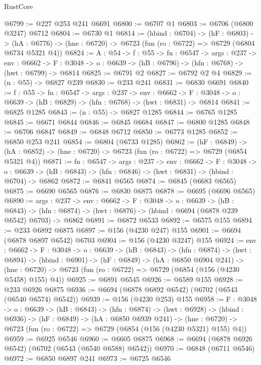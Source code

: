 \begin{lexlean}{RustCore}
\begin{coremodule}
@6799 := @227 @253 @241 @6691
@6800 := @6707 @1
@6803 := @6706 (@6800 @3247) @6712
@6804 := @6730 @1
@6814 := (hbind : @6704) ->
  (hF : @6803) ->
  (hA : @6776) -> (hne : @6720) -> @6723 (fun (ro : @6722) => @6729 (@6804 @6734 @5321 @4))
@6824 := {A : @54} ->
  {f : @55} ->
  {fn : @6547} ->
  {args : @237} ->
  {env : @6662} ->
  {F : @3048} -> {o : @6639} -> (hB : @6796) -> (hfn : @6768) -> (hwt : @6799) -> @6814
@6825 := @6791 @2
@6827 := @6792 @2 @4
@6829 := (n : @55) -> @6827 @239
@6830 := @233 @241
@6831 := @6830 @6691
@6840 := {f : @55} ->
  {fn : @6547} ->
  {args : @237} ->
  {env : @6662} ->
  {F : @3048} -> {o : @6639} -> (hB : @6829) -> (hfn : @6768) -> (hwt : @6831) -> @6814
@6841 := @6825 @1285
@6843 := (n : @55) -> @6827 @1285
@6844 := @6765 @1285
@6845 := @6671 @6844
@6846 := @6845 @6684
@6847 := @6800 @1285
@6848 := @6706 @6847
@6849 := @6848 @6712
@6850 := @6773 @1285
@6852 := @6850 @253 @241
@6854 := @6804 (@6733 @1285)
@6862 := (hF : @6849) ->
  (hA : @6852) -> (hne : @6720) -> @6723 (fun (ro : @6722) => @6729 (@6854 @5321 @4))
@6871 := {fn : @6547} ->
  {args : @237} ->
  {env : @6662} ->
  {F : @3048} ->
  {o : @6639} -> (hB : @6843) -> (hfn : @6846) -> (hwt : @6831) -> (hbind : @6704) -> @6862
@6872 := @6841 @6565
@6874 := @6845 (@6683 @6565)
@6875 := @6690 @6565
@6876 := @6830 @6875
@6878 := @6695 (@6696 @6565)
@6890 := {args : @237} ->
  {env : @6662} ->
  {F : @3048} ->
  {o : @6639} ->
  (hB : @6843) ->
  (hfn : @6874) -> (hwt : @6876) -> (hbind : @6694 (@6878 @239 @6542) @6703) -> @6862
@6891 := @6872 @6533
@6892 := @6575 @155
@6894 := @233 @6892 @6875
@6897 := @156 (@4230 @247) @155
@6901 := @6694 (@6878 @6897 @6542) @6703
@6904 := @156 (@4230 @3247) @155
@6924 := {env : @6662} ->
  {F : @3048} ->
  {o : @6639} ->
  (hB : @6843) ->
  (hfn : @6874) ->
  (hwt : @6894) ->
  (hbind : @6901) ->
  (hF : @6849) ->
  (hA : @6850 @6904 @241) ->
  (hne : @6720) -> @6723 (fun (ro : @6722) => @6729 (@6854 (@156 (@4230 @5458) @155) @4))
@6925 := @6891 @6545
@6926 := @6589 @155
@6928 := @233 @6926 @6875
@6936 := @6694 (@6878 @6892 @6542) (@6702 (@6543 (@6540 @6574) @6542))
@6939 := @156 (@4230 @253) @155
@6958 := {F : @3048} ->
  {o : @6639} ->
  (hB : @6843) ->
  (hfn : @6874) ->
  (hwt : @6928) ->
  (hbind : @6936) ->
  (hF : @6849) ->
  (hA : @6850 @6939 @241) ->
  (hne : @6720) -> @6723 (fun (ro : @6722) => @6729 (@6854 (@156 (@4230 @5321) @155) @4))
@6959 := @6925 @6546
@6960 := @6605 @6875
@6968 := @6694 (@6878 @6926 @6542) (@6702 (@6543 (@6540 @6588) @6542))
@6970 := @6848 (@6711 @6546)
@6972 := @6850 @6897 @241
@6973 := @6725 @6546

\end{coremodule}
\end{lexlean}
